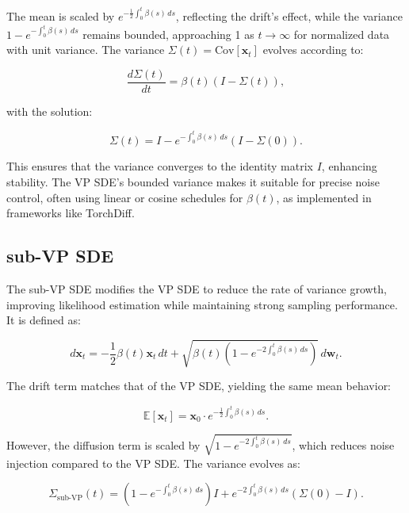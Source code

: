 \documentclass[12pt]{article}
\begin{document}
The mean is scaled by $e^{-\frac{1}{2} \int_0^t \beta(s) \, ds}$, reflecting the drift’s effect, while the variance $1 - e^{-\int_0^t \beta(s) \, ds}$ remains bounded, approaching 1 as $t \to \infty$ for normalized data with unit variance. The variance $\Sigma(t) = \mathrm{Cov}[\mathbf{x}_t]$ evolves according to:

\begin{equation}
    \frac{d \Sigma(t)}{dt} = \beta(t) (I - \Sigma(t)),
\end{equation}

with the solution:

\begin{equation}
    \Sigma(t) = I - e^{-\int_0^t \beta(s) \, ds} \left( I - \Sigma(0) \right).
\end{equation}

This ensures that the variance converges to the identity matrix $I$, enhancing stability. The VP SDE’s bounded variance makes it suitable for precise noise control, often using linear or cosine schedules for $\beta(t)$, as implemented in frameworks like TorchDiff.

\subsection{sub-VP SDE}

The sub-VP SDE modifies the VP SDE to reduce the rate of variance growth, improving likelihood estimation while maintaining strong sampling performance. It is defined as:

\begin{equation}
    d\mathbf{x}_t = -\frac{1}{2} \beta(t) \mathbf{x}_t \, dt + \sqrt{\beta(t) \left(1 - e^{-2 \int_0^t \beta(s) \, ds}\right)} \, d\mathbf{w}_t.
\end{equation}

The drift term matches that of the VP SDE, yielding the same mean behavior:

\begin{equation}
    \mathbb{E}[\mathbf{x}_t] = \mathbf{x}_0 \cdot e^{-\frac{1}{2} \int_0^t \beta(s) \, ds}.
\end{equation}

However, the diffusion term is scaled by $\sqrt{1 - e^{-2 \int_0^t \beta(s) \, ds}}$, which reduces noise injection compared to the VP SDE. The variance evolves as:

\begin{equation}
    \Sigma_{\text{sub-VP}}(t) = \left(1 - e^{-\int_0^t \beta(s) \, ds}\right) I + e^{-2 \int_0^t \beta(s) \, ds} \left( \Sigma(0) - I \right).
\end{equation}
\end{document}
